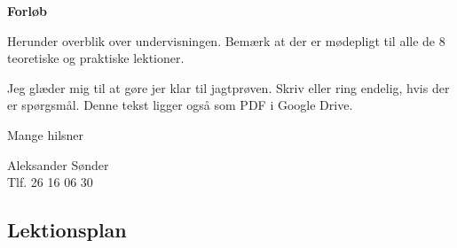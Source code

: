 \documentclass[10pt,a4paper]{article}
\begin{document}
\begin{flushleft}
\vspace{0.4cm}
\textbf{Forløb}

\vspace{0.1cm}
Herunder overblik over undervisningen. Bemærk at der er mødepligt til alle de 8 teoretiske og praktiske lektioner.

\vspace{0.3cm}


\vspace{0.4cm}
Jeg glæder mig til at gøre jer klar til jagtprøven. Skriv eller ring endelig, hvis der er spørgsmål. Denne tekst ligger også som PDF i Google Drive.

\vspace{0.3cm}
Mange hilsner

\vspace{0.2cm}
Aleksander Sønder\\
Tlf. 26 16 06 30

\end{flushleft}

\vspace{0.4cm}

\subsection*{Lektionsplan}
\vspace{0.2cm}
\end{document}
